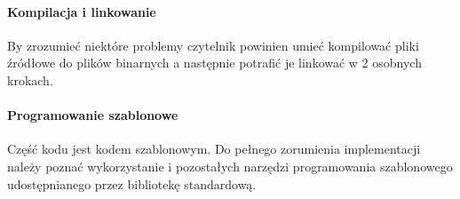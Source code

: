 \paragraph{Kompilacja i linkowanie}
By zrozumieć niektóre problemy czytelnik powinien umieć kompilować pliki źródłowe do plików binarnych a następnie potrafić je linkować w 2 osobnych krokach.

\paragraph{Programowanie szablonowe}
Część kodu jest kodem szablonowym. Do pełnego zorumienia implementacji należy poznać wykorzystanie  i pozostałych narzędzi programowania szablonowego udostępnianego przez bibliotekę standardową.
